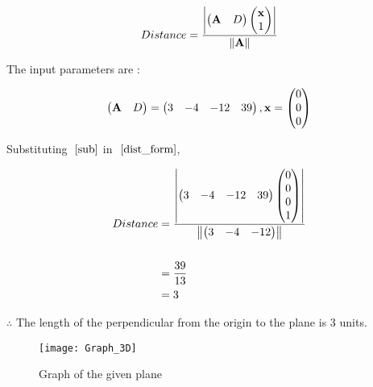 \documentclass[journal,12pt,twocolumn]{IEEEtran}
\begin{document}
	\begin{align}
		Distance = \frac{\left\vert\begin{pmatrix}\mathbf{A} & D\end{pmatrix} \begin{pmatrix}\mathbf{x} \\ 1\end{pmatrix}\right\vert}{\left\lVert\mathbf{A}\right\rVert}
			\label{dist_form}
	\end{align}
	
	
	The input parameters are :
	
	\begin{align}
		\begin{pmatrix}\mathbf{A} & D\end{pmatrix} = \begin{pmatrix}3 & -4 & -12 & 39\end{pmatrix},
		\mathbf{x} = \begin{pmatrix}0 \\ 0 \\ 0\end{pmatrix}
			\label{sub}
	\end{align}
	
	
	Substituting $~\eqref{sub}$ in $~\eqref{dist_form}$,
	
	\begin{align}
		Distance &= \frac{\left\vert\begin{pmatrix}3 & -4 & -12 & 39\end{pmatrix} \begin{pmatrix}0 \\ 0 \\ 0 \\ 1\end{pmatrix}\right\vert}{\left\lVert\begin{pmatrix}3 & -4 & -12\end{pmatrix}\right\rVert}  \\
				\nonumber\\
				&= \frac{39}{13} \\
				&= 3
	\end{align}
		
		
	$\therefore$ The length of the perpendicular from the origin to the plane  is \underline{$3$} units.


	\begin{figure}[h!]
		\centering
		\texttt{[image: Graph\_3D]}
		\caption{Graph of the given plane}
	\end{figure}
\end{document}
